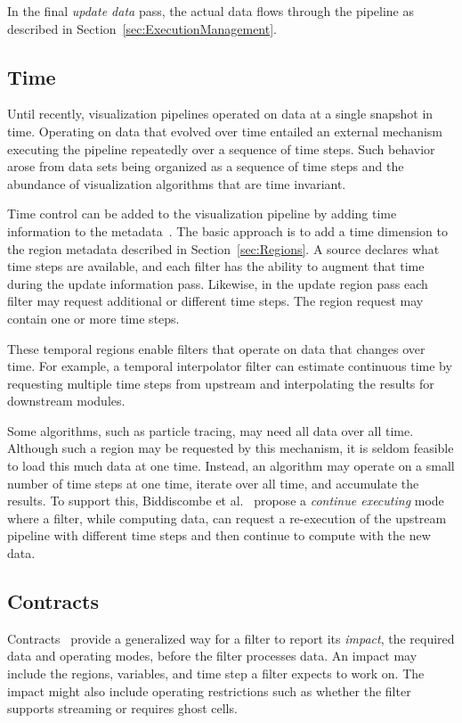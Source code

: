 \documentclass[journal,twocolumn,10pt,letterpaper,twoside]{IEEEtran}
\newcommand*{\lcite}[1]{~\cite{#1}}
\newcommand*{\scite}[1]{~\cite{#1}}
\newcommand*{\keyterm}[1]{\emph{#1}}
\newcommand{\etal}{et al.}
\begin{document}
In the final \keyterm{update data} pass, the actual data flows through the
pipeline as described in Section~\ref{sec:ExecutionManagement}.

\subsection{Time}
\label{sec:Time}

Until recently, visualization pipelines operated on data at a single
snapshot in time.  Operating on data that evolved over time entailed an
external mechanism executing the pipeline repeatedly over a sequence of
time steps.  Such behavior arose from data sets being organized as a
sequence of time steps and the abundance of visualization algorithms that
are time invariant.

Time control can be added to the visualization pipeline by adding time
information to the metadata\lcite{Biddiscombe2007}.  The basic approach is
to add a time dimension to the region metadata described in
Section~\ref{sec:Regions}.  A source declares what time steps are
available, and each filter has the ability to augment that time during the
update information pass.  Likewise, in the update region pass each filter
may request additional or different time steps.  The region request may contain
one or more time steps.

These temporal regions enable filters that operate on data that changes
over time.  For example, a temporal interpolator filter can estimate
continuous time by requesting multiple time steps from upstream and
interpolating the results for downstream modules.

Some algorithms, such as particle tracing, may need all data over all time.
Although such a region may be requested by this mechanism, it is seldom
feasible to load this much data at one time.  Instead, an algorithm may
operate on a small number of time steps at one time, iterate over all time,
and accumulate the results.  To support this, Biddiscombe
\etal\scite{Biddiscombe2007} propose a \keyterm{continue executing} mode
where a filter, while computing data, can request a re-execution of the
upstream pipeline with different time steps and then continue to compute
with the new data.

\subsection{Contracts}
\label{sec:Contracts}

Contracts\lcite{Childs2005} provide a generalized way for a filter to report
its \keyterm{impact}, the required data and operating modes, before the
filter processes data.  An impact may include the regions, variables, and
time step a filter expects to work on.  The impact might also include
operating restrictions such as whether the filter supports streaming or
requires ghost cells.
\end{document}
